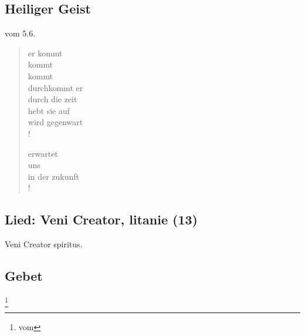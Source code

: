 \subsection{Heiliger Geist}
\cite{KHH} vom 5.6.
\begin{gedicht}
\begin{verse}
er kommt\\
   kommt\\
   kommt\\
durchkommt er\\
durch die zeit\\
hebt sie auf\\
wird gegenwart\\!

erwartet\\
uns\\
in der zukunft\\!
\end{verse}
\end{gedicht}
\subsection{Lied: Veni Creator, litanie (13)}
Veni Creator spiritus.

\subsection{Gebet}
\footnote{\cite{FR-heute} vom }
